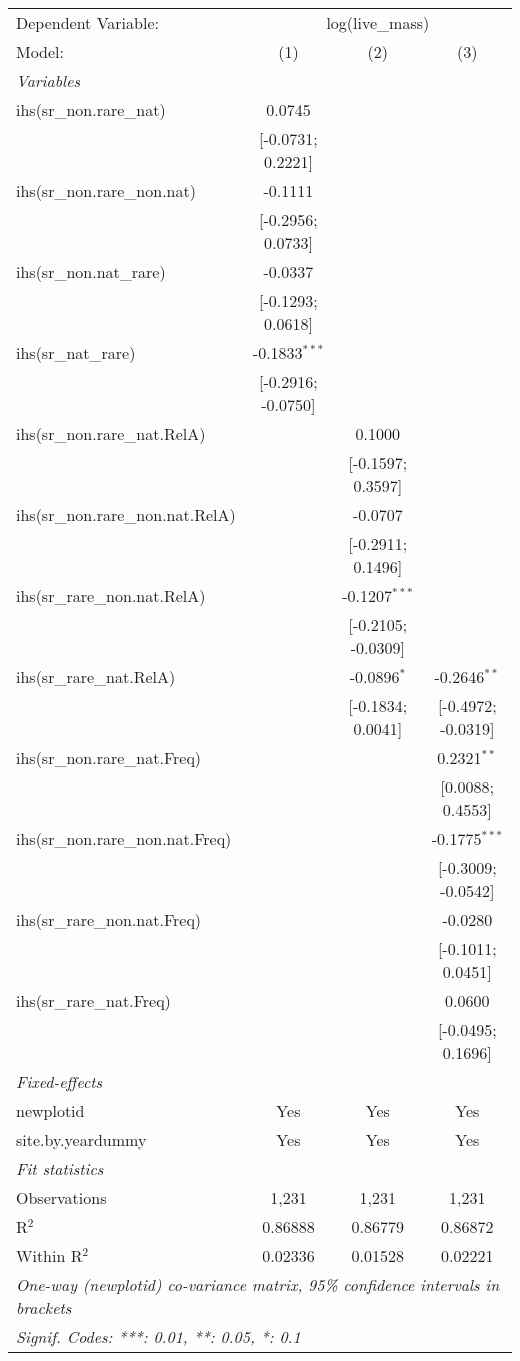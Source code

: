 \begin{tabular}{lccc}
\tabularnewline\midrule\midrule
Dependent Variable:&\multicolumn{3}{c}{log(live\_mass)}\\
Model:&(1) & (2) & (3)\\
\midrule \emph{Variables}&   &   &  \\
ihs(sr\_non.rare\_nat)&0.0745 &    &   \\
  &[-0.0731; 0.2221] &    &   \\
ihs(sr\_non.rare\_non.nat)&-0.1111 &    &   \\
  &[-0.2956; 0.0733] &    &   \\
ihs(sr\_non.nat\_rare)&-0.0337 &    &   \\
  &[-0.1293; 0.0618] &    &   \\
ihs(sr\_nat\_rare)&-0.1833$^{***}$ &    &   \\
  &[-0.2916; -0.0750] &    &   \\
ihs(sr\_non.rare\_nat.RelA)&   & 0.1000 &   \\
  &   & [-0.1597; 0.3597] &   \\
ihs(sr\_non.rare\_non.nat.RelA)&   & -0.0707 &   \\
  &   & [-0.2911; 0.1496] &   \\
ihs(sr\_rare\_non.nat.RelA)&   & -0.1207$^{***}$ &   \\
  &   & [-0.2105; -0.0309] &   \\
ihs(sr\_rare\_nat.RelA)&   & -0.0896$^{*}$ & -0.2646$^{**}$\\
  &   & [-0.1834; 0.0041] & [-0.4972; -0.0319]\\
ihs(sr\_non.rare\_nat.Freq)&   &    & 0.2321$^{**}$\\
  &   &    & [0.0088; 0.4553]\\
ihs(sr\_non.rare\_non.nat.Freq)&   &    & -0.1775$^{***}$\\
  &   &    & [-0.3009; -0.0542]\\
ihs(sr\_rare\_non.nat.Freq)&   &    & -0.0280\\
  &   &    & [-0.1011; 0.0451]\\
ihs(sr\_rare\_nat.Freq)&   &    & 0.0600\\
  &   &    & [-0.0495; 0.1696]\\
\midrule \emph{Fixed-effects}&   &   &  \\
newplotid & Yes & Yes & Yes\\
site.by.yeardummy & Yes & Yes & Yes\\
\midrule \emph{Fit statistics}&  & & \\
Observations & 1,231&1,231&1,231\\
R$^2$ & 0.86888&0.86779&0.86872\\
Within R$^2$ & 0.02336&0.01528&0.02221\\
\midrule\midrule\multicolumn{4}{l}{\emph{One-way (newplotid) co-variance matrix, 95\% confidence intervals in brackets}}\\
\multicolumn{4}{l}{\emph{Signif. Codes: ***: 0.01, **: 0.05, *: 0.1}}\\
\end{tabular}


